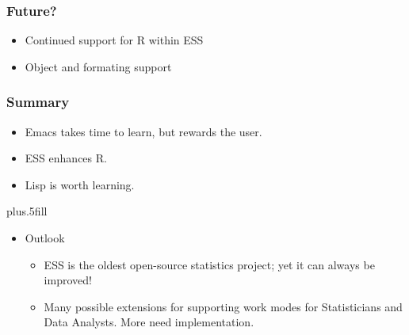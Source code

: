 \documentclass{beamer}
\begin{document}
\begin{frame}
  \frametitle{Future?}
  \begin{itemize}
  \item Continued support for R within ESS
  \item Object and formating support
  \end{itemize}
\end{frame}


\begin{frame}
  \frametitle<presentation>{Summary}

  \begin{itemize}
  \item
    Emacs takes time to learn, but rewards the user.
  \item
    ESS enhances R.
  \item
    Lisp is worth learning.
  \end{itemize}
  
  \vskip0pt plus.5fill
  \begin{itemize}
  \item
    Outlook
    \begin{itemize}
    \item
      ESS is the oldest open-source statistics project; yet it can
      always be improved!
    \item
      Many possible extensions for supporting work modes for
      Statisticians and Data Analysts.  More need implementation.
    \end{itemize}
  \end{itemize}
\end{frame}
\end{document}

